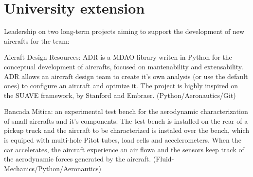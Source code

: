 \documentclass[A4]{deedy-resume} %
\begin{document}
\begin{minipage}[t]{0.67\textwidth}
\section{University extension}

\vspace{\topsep} %
\begin{tightitemize}

\item Leadership on two long-term projects aiming to support the development of new aircrafts for the team:
\begin{tightitemize}

\item Aicraft Design Resources: ADR is a MDAO library writen in Python for the conceptual development of aircrafts, focused on mantenability and extensability. ADR allows an aircraft design team to create it's own analysis (or use the default ones) to configure an aircraft and optmize it. The project is highly inspired on the SUAVE framework, by Stanford and Embraer. (Python/Aeronautics/Git)

\item Bancada Mitica: an experimental test bench for the aerodynamic characterization of small aircrafts and it's components. The  test bench is installed on the rear of a pickup truck and the aircraft to be characterized is instaled over the bench, which is equiped with multi-hole Pitot tubes, load cells and accelerometers. When the car accelerates, the aircraft experience an air flowa and the sensors keep track of the aerodynamic forces generated by the aircraft. (Fluid-Mechanics/Python/Aeronautics)

\end{tightitemize}

\end{tightitemize}

\sectionspace %




\sectionspace %

\sectionspace



\end{minipage} %
\end{document}

